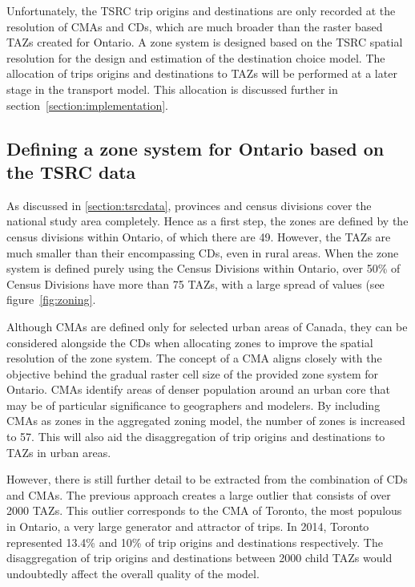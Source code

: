 
Unfortunately, the TSRC trip origins and destinations are only recorded at the resolution of CMAs and CDs, which are much broader than the raster based TAZs created for Ontario. A zone system is designed based on the TSRC spatial resolution for the design and estimation of the destination choice model. The allocation of trips origins and destinations to TAZs will be performed at a later stage in the transport model. This allocation is discussed further in section~\ref{section:implementation}.


\subsection{Defining a zone system for Ontario based on the TSRC data}
\label{section:zoning}
As discussed in \ref{section:tsrcdata}, provinces and census divisions cover the national study area completely. Hence as a first step, the zones are defined by the census divisions within Ontario, of which there are 49. However, the TAZs are much smaller than their encompassing CDs, even in rural areas. When the zone system is defined purely using the Census Divisions within Ontario, over 50\% of Census Divisions have more than 75 TAZs, with a large spread of values (see figure~\ref{fig:zoning}. 

Although CMAs are defined only for selected urban areas of Canada, they can be considered alongside the CDs when allocating zones to improve the spatial resolution of the zone system. The concept of a CMA aligns closely with the objective behind the gradual raster cell size of the provided zone system for Ontario. CMAs identify areas of denser population around an urban core that may be of particular significance to geographers and modelers. By including CMAs as zones in the aggregated zoning model, the number of zones is increased to 57. This will also aid the disaggregation of trip origins and destinations to TAZs in urban areas. 

However, there is still further detail to be extracted from the combination of CDs and CMAs. The previous approach creates a large outlier that consists of over 2000 TAZs. This outlier corresponds to the CMA of Toronto, the most populous in Ontario, a very large generator and attractor of trips. In 2014, Toronto represented 13.4\% and 10\% of trip origins and destinations respectively. The disaggregation of trip origins and destinations between 2000 child TAZs would undoubtedly affect the overall quality of the model. 

